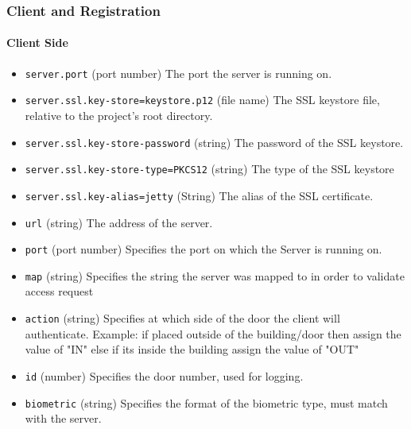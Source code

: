 \subsubsection{Client and Registration}
\paragraph{Client Side}
\begin{itemize}
\item \verb!server.port! (port number) The port the server is running on.
\item \verb!server.ssl.key-store=keystore.p12! (file name) The SSL keystore file, relative to the project's root directory.
\item \verb!server.ssl.key-store-password! (string) The password of the SSL keystore.
\item \verb!server.ssl.key-store-type=PKCS12! (string) The type of the SSL keystore 
\item \verb!server.ssl.key-alias=jetty! (String) The alias of the SSL certificate.

\item \verb!url! (string) The address of the server.
\item \verb!port! (port number) Specifies the port on which the Server is running on.
\item \verb!map! (string) Specifies the string the server was mapped to in order to validate access request
\item \verb!action! (string) Specifies at which side of the door the client will authenticate. Example: if placed outside of the building/door then assign the value of "IN" else if its inside the building assign the value of "OUT"
\item \verb!id! (number) Specifies the door number, used for logging.
\item \verb!biometric! (string) Specifies the format of the biometric type, must match with the server.
\end{itemize}


